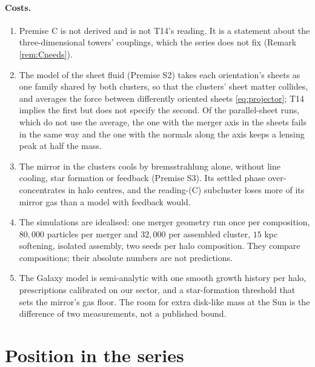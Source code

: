 \documentclass[11pt]{article}
\theoremstyle{definition}
\begin{document}
\paragraph{Costs.}
\begin{enumerate}
\item[(K1)] Premise C is not derived and is not T14's reading. It is a statement about the three-dimensional towers' couplings, which the series does not fix (Remark \ref{rem:Cneeds}).
\item[(K2)] The model of the sheet fluid (Premise S2) takes each orientation's sheets as one family shared by both clusters, so that the clusters' sheet matter collides, and averages the force between differently oriented sheets \eqref{eq:projector}; T14 implies the first \cite[Lem.~6.1, Prem.~7.4]{ButlerT14} but does not specify the second. Of the parallel-sheet runs, which do not use the average, the one with the merger axis in the sheets fails in the same way and the one with the normals along the axis keeps a lensing peak at half the mass.
\item[(K3)] The mirror in the clusters cools by bremsstrahlung alone, without line cooling, star formation or feedback (Premise S3). Its settled phase over-concentrates in halo centres, and the reading-(C) subcluster loses more of its mirror gas than a model with feedback would.
\item[(K4)] The simulations are idealised: one merger geometry run once per composition, $80{,}000$ particles per merger and $32{,}000$ per assembled cluster, $15$ kpc softening, isolated assembly, two seeds per halo composition. They compare compositions; their absolute numbers are not predictions.
\item[(K5)] The Galaxy model is semi-analytic with one smooth growth history per halo, prescriptions calibrated on our sector, and a star-formation threshold that sets the mirror's gas floor. The room for extra disk-like mass at the Sun is the difference of two measurements, not a published bound.
\end{enumerate}

\section{Position in the series}\label{sec:position}
\end{document}
